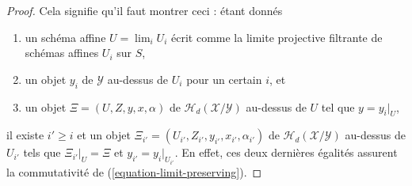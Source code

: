 \begin{proof}
Cela signifie qu'il faut montrer ceci : étant donnés
\begin{enumerate}
\item un schéma affine $U = \lim_i U_i$ écrit comme la
limite projective filtrante de schémas affines $U_i$ sur $S$,
\item un objet $y_i$ de $\mathcal{Y}$ au-dessus de $U_i$ pour un certain $i$, et
\item un objet $\Xi = (U, Z, y, x, \alpha)$ de
$\mathcal{H}_d(\mathcal{X}/\mathcal{Y})$
au-dessus de $U$ tel que $y = y_i|_U$,
\end{enumerate}
il existe $i' \geq i$ et un objet
$\Xi_{i'} = (U_{i'}, Z_{i'}, y_{i'}, x_{i'}, \alpha_{i'})$ de
$\mathcal{H}_d(\mathcal{X}/\mathcal{Y})$ au-dessus de $U_{i'}$ tels que
$\Xi_{i'}|_U = \Xi$ et $y_{i'} = y_i|_{U_{i'}}$.
En effet, ces deux dernières égalités assurent la commutativité de
(\ref{equation-limit-preserving}).


\end{proof}
